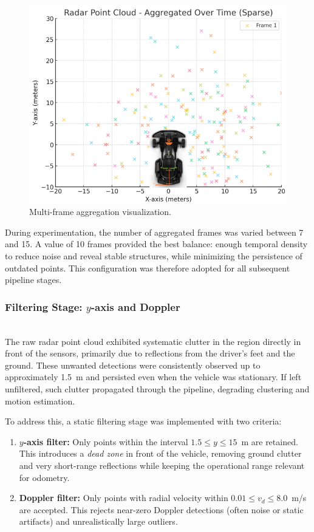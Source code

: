 \begin{figure}[!htbp]
    \centering
    \includegraphics[width=0.5\linewidth]{images/multiframe.png}
    \caption{Multi-frame aggregation visualization.}
    \label{fig:multiframe}
\end{figure}

During experimentation, the number of aggregated frames was varied between 7 and 15.  
A value of 10 frames provided the best balance: enough temporal density to reduce noise and reveal stable structures, while minimizing the persistence of outdated points.  
This configuration was therefore adopted for all subsequent pipeline stages.

\vspace{0.5em}
\subsubsection{Filtering Stage: $y$-axis and Doppler}
\hfill 
\\
The raw radar point cloud exhibited systematic clutter in the region directly in front of the sensors, primarily due to reflections from the driver’s feet and the ground.  
These unwanted detections were consistently observed up to approximately \SI{1.5}{\meter} and persisted even when the vehicle was stationary.  
If left unfiltered, such clutter propagated through the pipeline, degrading clustering and motion estimation.  

To address this, a static filtering stage was implemented with two criteria:
\begin{enumerate}
    \item \textbf{$y$-axis filter:} Only points within the interval $1.5 \leq y \leq 15$~m are retained.  
    This introduces a \textit{dead zone} in front of the vehicle, removing ground clutter and very short-range reflections while keeping the operational range relevant for odometry.
    \item \textbf{Doppler filter:} Only points with radial velocity within $0.01 \leq v_d \leq 8.0$~m/s are accepted.  
    This rejects near-zero Doppler detections (often noise or static artifacts) and unrealistically large outliers.
\end{enumerate}

